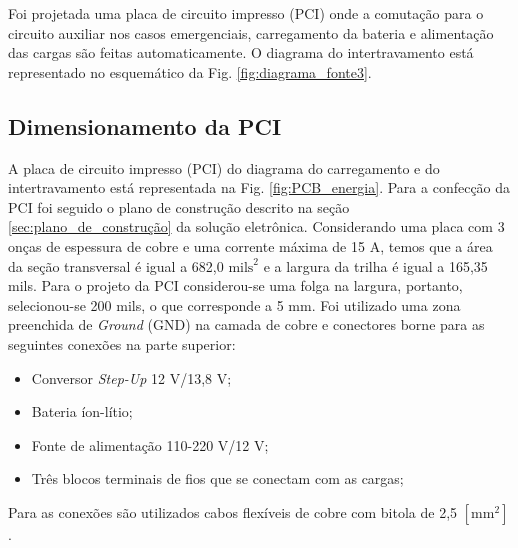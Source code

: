 Foi projetada uma placa de circuito impresso (PCI) onde a comutação para o circuito auxiliar nos casos emergenciais, carregamento da bateria e alimentação das cargas são feitas automaticamente. O diagrama do intertravamento está representado no esquemático da Fig. \ref{fig:diagrama_fonte3}.


\subsection{Dimensionamento da PCI}

A placa de circuito impresso (PCI) do diagrama do carregamento e do intertravamento está representada na Fig. \ref{fig:PCB_energia}. Para a confecção da PCI foi seguido o plano de construção descrito na seção \ref{sec:plano_de_construção} da solução eletrônica. Considerando uma placa com 3 onças de espessura de cobre e uma corrente máxima de 15 A, temos que a área da seção transversal é igual a 682,0 $\text{mils}^2$ e a largura da trilha é igual a 165,35 mils. Para o projeto da PCI considerou-se uma folga na largura, portanto, selecionou-se 200 mils, o que corresponde a 5 mm. Foi utilizado uma zona preenchida de \textit{Ground} (GND) na camada de cobre e conectores borne para as seguintes conexões na parte superior:

\begin{itemize}
    \item Conversor \textit{Step-Up} 12 V/13,8 V;
    
    \item Bateria íon-lítio;
    
    \item Fonte de alimentação 110-220 V/12 V;
    
    \item Três blocos terminais de fios que se conectam com as cargas; 
\end{itemize}

Para as conexões são utilizados cabos flexíveis de cobre com bitola de 2,5 $[\text{mm}^2]$. 

